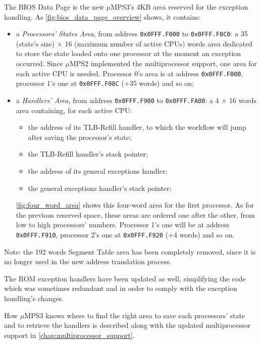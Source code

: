 \documentclass[12pt,a4paper,openright,twoside]{report}
\begin{document}
The BIOS Data Page is the new $\mu$MPS3's 4KB area reserved for the exception handling.
As \autoref{fig:bios_data_page_overview} shows, it contains:
\begin{itemize}
	\item a \textit{Processors' States Area}, from address \texttt{0x0FFF.F000} to \texttt{0x0FFF.F8C0}: a 35 (state's size) $\times$ 16 (maximum number of active CPUs) words area dedicated to store the state loaded onto one processor at the moment an exception occurred.
	      Since $\mu$MPS2 implemented the multiprocessor support, one area for each active CPU is needed.
	      Processor 0's area is at address \texttt{0x0FFF.F000}, processor 1's one at \texttt{0x0FFF.F08C} (+35 words) and so on;
	\item a \textit{Handlers' Area}, from address \texttt{0x0FFF.F900} to \texttt{0x0FFF.FA00}: a 4 $\times$ 16 words area containing, for each active CPU:
	      \begin{itemize}
		      \item the address of its TLB-Refill handler, to which the workflow will jump after saving the processor's state;
		      \item the TLB-Refill handler's stack pointer;
		      \item the address of its general exceptions handler;
		      \item the general exceptions handler's stack pointer;
	      \end{itemize}
	      \autoref{fig:four_word_area} shows this four-word area for the first processor.
	      As for the previous reserved space, these areas are ordered one after the other, from low to high processors' numbers.
	      Processor 1's one will be at address \texttt{0x0FFF.F910}, processor 2's one at \texttt{0x0FFF.F920} (+4 words) and so on.
\end{itemize}

Note: the 192 words Segment Table area has been completely removed, since it is no longer used in the new address translation process.
\newline

The ROM exception handlers have been updated as well, simplifying the code which was sometimes redundant and in order to comply with the exception handling's changes.

How $\mu$MPS3 knows where to find the right area to save each processors' state and to retrieve the handlers is described along with the updated multiprocessor support in \autoref{chap:multiprocessor_support}.
\end{document}
